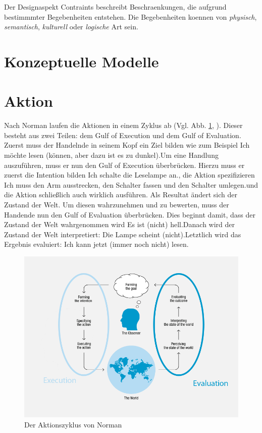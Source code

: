 \documentclass[parskip,headsepline, headtopline, %
footsepline, oneside, 12pt, headings=small]{scrreprt}
\begin{document}
Der Designaspekt Contraints beschreibt Beschraenkungen, die aufgrund bestimmmter Begebenheiten entstehen. Die Begebenheiten koennen von \textit{physisch}, \textit{semantisch}, \textit{kulturell} oder \textit{logische} Art sein.

\section{Konzeptuelle Modelle}


\section{Aktion}

Nach Norman laufen die Aktionen in einem Zyklus ab (Vgl. Abb. \ref{fig:action}, \cite[S. 46ff]{don}). Dieser besteht aus zwei Teilen: dem Gulf of Execution und dem Gulf of Evaluation. Zuerst muss der Handelnde in seinem Kopf ein Ziel bilden wie zum Beispiel \glqq Ich möchte lesen (können, aber dazu ist es zu dunkel).\grqq Um eine Handlung auszuführen, muss er nun den Gulf of Execution überbrücken. Hierzu muss er zuerst die Intention bilden \glqq Ich schalte die Leselampe an.\grqq, die Aktion spezifizieren \glqq Ich muss den Arm ausstrecken, den Schalter fassen und den Schalter umlegen.\grqq und die Aktion schließlich auch wirklich ausführen. Als Resultat ändert sich der Zustand der Welt. Um diesen wahrzunehmen und zu bewerten, muss der Handende nun den Gulf of Evaluation überbrücken. Dies beginnt damit, dass der Zustand der Welt wahrgenommen wird \glqq Es ist (nicht) hell.\grqq Danach wird der Zustand der Welt interpretiert: \glqq Die Lampe scheint (nicht).\grqq Letztlich wird das Ergebnis evaluiert: \glqq Ich kann jetzt (immer noch nicht) lesen.\grqq

\begin{figure}
\includegraphics[width=\textwidth]{images/ActionCycle.png}
\caption{Der Aktionszyklus von Norman}
\label{fig:action}
\end{figure}
\end{document}
